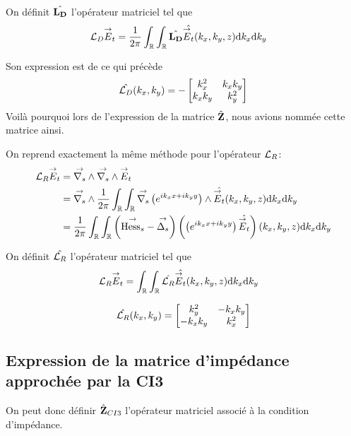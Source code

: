     On définit \(\hat{\mathbf{L_D}}\) l'opérateur matriciel tel que
    \begin{align}
      {\mathcal{L}_D} {\overset{\rightarrow}{E}}_t
      &= \dfrac{1}{2\pi}\int_\mathbb R\int_\mathbb R \hat{\mathbf{L_D}} \hat{{\overset{\rightarrow}{E}}_t}(k_x,k_y,z)\mathrm{d}{k_x}\mathrm{d}{k_y}
    \end{align}

    Son expression est de ce qui précède
    \begin{equation}
      \label{eq:plan:fourier:LD}
      \hat{{\mathcal{L}_D}}(k_x,k_y) = -
      \begin{bmatrix}
        k_x^2 & k_x k_y
        \\
        k_x k_y & k_y^2
      \end{bmatrix}
    \end{equation}
    Voilà pourquoi lors de l'expression de la matrice \(\hat{\mathbf{Z}}\), nous avions nommée cette matrice ainsi.

    On reprend exactement la même méthode pour l'opérateur \({\mathcal{L}_R}\):
    \begin{align}
      {\mathcal{L}_R} {\overset{\rightarrow}{E}}_t & = {\overset{\rightarrow}{\nabla_s}} \wedge{} {\overset{\rightarrow}{\nabla_s}} \wedge{} {\overset{\rightarrow}{E}}_t
      \\
      &={\overset{\rightarrow}{\nabla_s}} \wedge{} \dfrac{1}{2\pi}\int_\mathbb R\int_\mathbb R {\overset{\rightarrow}{\nabla_s}}{}\left(e^{ik_xx + ik_yy}\right) \wedge \hat{{\overset{\rightarrow}{E}}_t}(k_x,k_y,z)\mathrm{d}{k_x}\mathrm{d}{k_y}
      \\
      &= \dfrac{1}{2\pi}\int_\mathbb R \int_\mathbb R \left({\overset{\rightarrow}{\operatorname{Hess}_s}} - {\overset{\rightarrow}{\Delta_s}}\right) \left(\left(e^{ik_xx + ik_yy}\right) \hat{{\overset{\rightarrow}{E}}_t}\right)(k_x,k_y,z)\mathrm{d}{k_x}\mathrm{d}{k_y}
    \end{align}

    On définit \(\hat{{\mathcal{L}_R}}\) l'opérateur matriciel tel que
    \begin{align}
      {\mathcal{L}_R} {\overset{\rightarrow}{E}}_t
      &= \int_\mathbb R\int_\mathbb R \hat{{\mathcal{L}_R}} \hat{{\overset{\rightarrow}{E}}_t}(k_x,k_y,z)\mathrm{d}{k_x}\mathrm{d}{k_y}
    \end{align}

    \begin{equation}
      \hat{{\mathcal{L}_R}}(k_x,k_y) =
      \begin{bmatrix}
        k_y^2 & -k_x k_y
        \\
        -k_x k_y & k_x^2
      \end{bmatrix}
    \end{equation}

  \subsection{Expression de la matrice d'impédance approchée par la CI3}

    On peut donc définir \(\hat{\mathbf{Z}}_{CI3}\) l’opérateur matriciel associé à la condition d'impédance.

